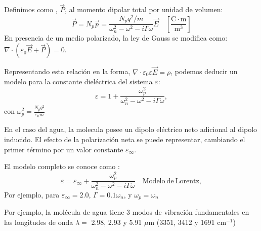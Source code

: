 \documentclass[letterpaper,10pt,english]{jupyterBook}
\let\sphinxpxdimen\pdfpxdimen\else\newdimen\sphinxpxdimen
\begin{document}
\sphinxAtStartPar
Definimos como , \(\vec{P}\), al momento dipolar total por unidad de volumen:
\begin{equation*}
\vec{P} = N_p \vec{p} = \frac{N_pq^2/m}{\omega_n^2 - \omega^2 - i\Gamma \omega}\vec{E}\quad\mathrm{\left[\frac{C\cdot m}{m^3}\right]}
\end{equation*}
\sphinxAtStartPar
En presencia de un medio polarizado, la ley de Gauss se modifica como: \(\nabla\cdot\left(\varepsilon_0\vec{E} + \vec{P}\right) = 0\).

\sphinxAtStartPar
Representando esta relación en la forma, \(\nabla\cdot\varepsilon_0\varepsilon\vec{E} = \rho\), podemos deducir un modelo para la constante dieléctrica del sistema \(\varepsilon\):
\begin{equation*}
\varepsilon = 1 +\frac{\omega_p^2}{\omega_n^2 - \omega^2 - i\Gamma \omega},
\end{equation*}
\sphinxAtStartPar
con \(\omega_p^2 = \frac{N_pq^2}{\varepsilon_0 m}\)

\sphinxAtStartPar
En el caso del agua, la molecula posee un dipolo eléctrico neto adicional al dipolo inducido. El efecto de la polarización neta se puede representar, cambiando el primer término por un valor constante \(\varepsilon_\infty\).

\sphinxAtStartPar
El modelo completo se conoce como :
\label{equation:3_Interacción_materia-luz/3_Interacción_materia-luz:104a7075-a176-4f2d-85dd-4c1eb1f6528b}\begin{equation}
\varepsilon = \varepsilon_\infty + \frac{\omega_p^2}{\omega_n^2 - \omega^2 - i\Gamma \omega}\quad\mathrm{Modelo~de~Lorentz},
\end{equation}
\sphinxAtStartPar
Por ejemplo, para \(\varepsilon_\infty = 2.0\), \(\Gamma = 0.1\omega_n\), y \(\omega_p = \omega_n\)

\noindent{\hspace*{\fill}\sphinxincludegraphics[width=800\sphinxpxdimen]{{Lorentz_model}.svg}\hspace*{\fill}}
\begin{quote}

\sphinxAtStartPar
{}
\end{quote}

\sphinxAtStartPar
Por ejemplo, la molécula de agua tiene 3 modos de vibración fundamentales en las longitudes de onda \(\lambda = \) 2.98, 2.93 y 5.91 \(\mu\)m (3351, 3412 y 1691 cm\(^{-1}\))
\end{document}
